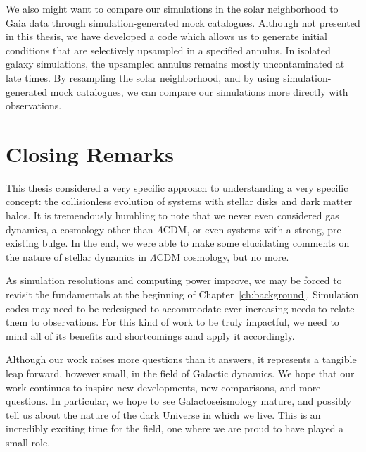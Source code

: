 We also might want to compare our simulations in the solar neighborhood to Gaia data through simulation-generated mock catalogues. Although not presented in this thesis, we have developed a code which allows us to generate initial conditions that are selectively upsampled in a specified annulus. In isolated galaxy simulations, the upsampled annulus remains mostly uncontaminated at late times. By resampling the solar neighborhood, and by using simulation-generated mock catalogues, we can compare our simulations more directly with observations.

\section{Closing Remarks}

This thesis considered a very specific approach to understanding a very specific concept: the collisionless evolution of systems with stellar disks and dark matter halos. It is tremendously humbling to note that we never even considered gas dynamics, a cosmology other than $\Lambda$CDM, or even systems with a strong, pre-existing bulge. In the end, we were able to make some elucidating comments on the nature of stellar dynamics in $\Lambda$CDM cosmology, but no more. 

As simulation resolutions and computing power improve, we may be forced to revisit the fundamentals at the beginning of Chapter~\ref{ch:background}. Simulation codes may need to be redesigned to accommodate ever-increasing needs to relate them to observations. For this kind of work to be truly impactful, we need to mind all of its benefits and shortcomings amd apply it accordingly.

Although our work raises more questions than it answers, it represents a tangible leap forward, however small, in the field of Galactic dynamics.  We hope that our work continues to inspire new developments, new comparisons, and more questions. In particular, we hope to see Galactoseismology mature, and possibly tell us about the nature of the dark Universe in which we live. This is an incredibly exciting time for the field, one where we are proud to have played a small role.




